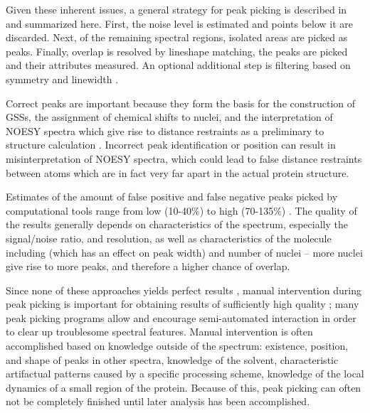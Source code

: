 Given these inherent issues, a general strategy for peak picking is 
described in \cite{autopsy, picky} and summarized here.
First, the noise level is estimated and points below it are discarded.
Next, of the remaining spectral regions, isolated areas are picked as peaks.
Finally, overlap is resolved by lineshape matching, the peaks are picked
and their attributes measured.  An optional additional step is filtering
based on symmetry and linewidth \cite{autopsy, picky}.

Correct peaks are important because they form the basis for the construction 
of GSSs, the assignment of chemical shifts to nuclei, and the interpretation of 
NOESY spectra which give rise to distance restraints as a preliminary to 
structure calculation \cite{guerry2011automated}.  
Incorrect peak identification or position can result 
in misinterpretation of NOESY spectra, which could lead to false distance 
restraints between atoms which are in fact very far apart in the actual 
protein structure.

Estimates of the amount of false positive and false negative peaks picked 
by computational tools range from low (10-40\%) to high (70-135\%) \cite{pine}. 
The quality of the results generally depends on characteristics of the 
spectrum, especially the signal/noise ratio, and resolution, as well as 
characteristics of the molecule including \mattfttwo{} (which has an 
effect on peak width) and number of nuclei -- more nuclei give rise to
more peaks, and therefore a higher chance of overlap.

Since none of these approaches yields perfect results \cite{guerry2011automated}, 
manual intervention during peak picking is important for obtaining results of 
sufficiently high quality \cite{guntert2009automated}; many peak picking 
programs allow and encourage semi-automated interaction in order to clear 
up troublesome spectral features.  
Manual intervention is often accomplished based on knowledge outside of the 
spectrum: existence, position, and shape of peaks in other spectra, knowledge 
of the solvent, characteristic artifactual patterns caused by a specific 
processing scheme, knowledge of the local dynamics of a small region of the 
protein.  \cite{williamson2009automated, guntert2009automated, 
altieri2004automation, baran2004automated}
Because of this, peak picking can often not be completely finished until 
later analysis has been accomplished.

